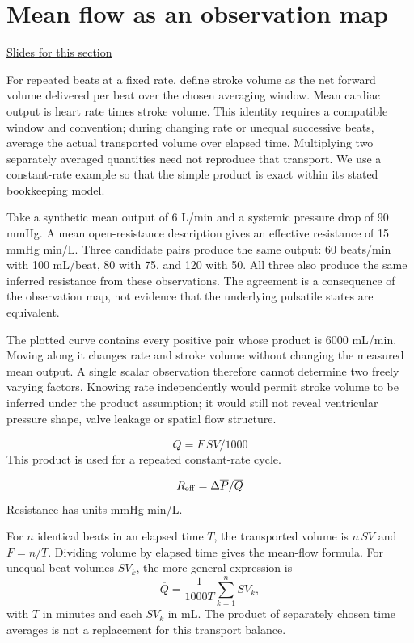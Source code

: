 \documentclass[11pt,letterpaper]{article}
\theoremstyle{definition}\newtheorem{definition}{Definition}\newtheorem{example}{Example}
\numberwithin{equation}{section}
\begin{document}
\section{Mean flow as an observation map}
\hypertarget{note-mean-flow-as-an-observation-map}{}\label{note:mean-flow-as-an-observation-map}
{\small \href{slides.html\#frame=transport-over-repeated-beats\&step=1}{Slides for this section}}\par
For repeated beats at a fixed rate, define stroke volume as the net forward volume delivered per beat over the chosen averaging window. Mean cardiac output is heart rate times stroke volume. This identity requires a compatible window and convention; during changing rate or unequal successive beats, average the actual transported volume over elapsed time. Multiplying two separately averaged quantities need not reproduce that transport. We use a constant-rate example so that the simple product is exact within its stated bookkeeping model.

Take a synthetic mean output of 6 L/min and a systemic pressure drop of 90 mmHg. A mean open-resistance description gives an effective resistance of 15 mmHg min/L. Three candidate pairs produce the same output: 60 beats/min with 100 mL/beat, 80 with 75, and 120 with 50. All three also produce the same inferred resistance from these observations. The agreement is a consequence of the observation map, not evidence that the underlying pulsatile states are equivalent.

The plotted curve contains every positive pair whose product is 6000 mL/min. Moving along it changes rate and stroke volume without changing the measured mean output. A single scalar observation therefore cannot determine two freely varying factors. Knowing rate independently would permit stroke volume to be inferred under the product assumption; it would still not reveal ventricular pressure shape, valve leakage or spatial flow structure.

\[
\overline Q=F\,SV/1000
\]
This product is used for a repeated constant-rate cycle.

\[
R_{\rm eff}=\Delta\overline P/\overline Q
\]
Resistance has units mmHg min/L.

For $n$ identical beats in an elapsed time $T$, the transported volume is $n\,SV$ and $F=n/T$. Dividing volume by elapsed time gives the mean-flow formula. For unequal beat volumes $SV_k$, the more general expression is
\[
 \overline Q=\frac{1}{1000T}\sum_{k=1}^{n}SV_k,
\]
with $T$ in minutes and each $SV_k$ in mL. The product of separately chosen time averages is not a replacement for this transport balance.
\end{document}
